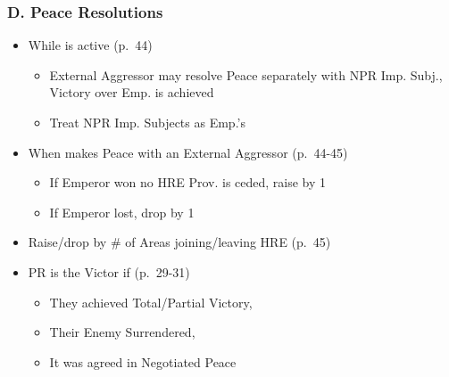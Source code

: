 \documentclass[10pt]{article}
\begin{document}
\subsubsection*{D. Peace Resolutions}
\begin{itemize}
	\item While  is active (p.~44)
	\begin{itemize}
		\item External Aggressor may  resolve Peace separately with NPR Imp. Subj.,  Victory over Emp. is achieved
		\item Treat NPR Imp. Subjects as Emp.'s \activeallies
	\end{itemize}
	\item When  makes Peace with an External Aggressor (p.~44-45)
	\begin{itemize}
		\item If Emperor won  no HRE Prov. is ceded, raise \authority by 1
		\item If Emperor lost, drop \authority by 1
	\end{itemize}
	\item Raise/drop \authority by \# of Areas joining/leaving HRE (p.~45)
	\item PR is the Victor if (p.~29-31)
	\begin{itemize}
		\item They achieved Total/Partial Victory, 
		\item Their Enemy Surrendered, 
		\item It was agreed in Negotiated Peace
	\end{itemize}
\end{itemize}
\end{document}
